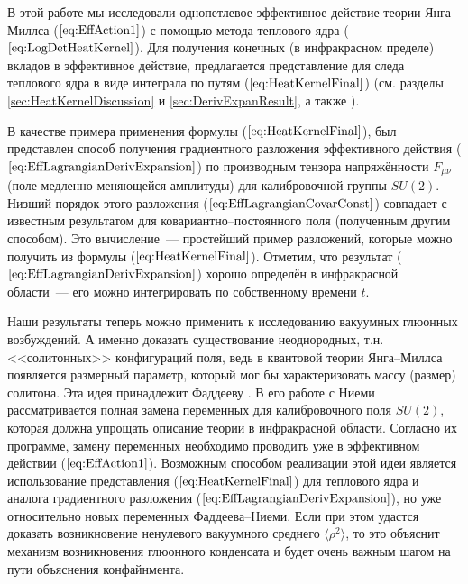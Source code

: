 
В этой работе мы исследовали однопетлевое эффективное действие теории Янга--Миллса ($\ref{eq:EffAction1}$) с помощью метода теплового ядра ($\ref{eq:LogDetHeatKernel}$). Для получения конечных (в инфракрасном пределе) вкладов в эффективное действие, предлагается представление для следа теплового ядра в виде интеграла по путям ($\ref{eq:HeatKernelFinal}$) (см. разделы \ref{sec:HeatKernelDiscussion} и \ref{sec:DerivExpanResult}, а также \cite{Mnev}).

В качестве примера применения формулы ($\ref{eq:HeatKernelFinal}$), был представлен способ получения градиентного разложения эффективного действия ($\ref{eq:EffLagrangianDerivExpansion}$) по производным тензора напряжённости $F_{\mu \nu}$ (поле медленно меняющейся амплитуды) для калибровочной группы $SU(2)$. Низший порядок этого разложения ($\ref{eq:EffLagrangianCovarConst}$) совпадает с известным результатом для ковариантно--постоянного поля \cite{Savvidy1977} (полученным другим способом). Это вычисление~--- простейший пример разложений, которые можно получить из формулы ($\ref{eq:HeatKernelFinal}$). Отметим, что результат ($\ref{eq:EffLagrangianDerivExpansion}$) хорошо определён в инфракрасной области~--- его можно интегрировать по собственному времени $t$.

Наши результаты теперь можно применить к исследованию вакуумных глюонных возбуждений. А именно доказать существование неоднородных, т.н. <<солитонных>> конфигураций поля, ведь  в квантовой теории Янга--Миллса появляется размерный параметр, который мог бы характеризовать массу (размер) солитона. Эта идея принадлежит Фаддееву \cite{Faddeev2008}. В его работе с Ниеми \cite{Faddeev2007} рассматривается полная замена переменных для калибровочного поля $SU(2)$, которая должна упрощать описание теории в инфракрасной области. Согласно их программе, замену переменных необходимо проводить уже в эффективном действии ($\ref{eq:EffAction1}$). Возможным способом реализации этой идеи является использование представления ($\ref{eq:HeatKernelFinal}$) для теплового ядра и аналога градиентного разложения ($\ref{eq:EffLagrangianDerivExpansion}$), но уже относительно новых переменных Фаддеева--Ниеми. Если при этом удастся доказать возникновение ненулевого вакуумного среднего $\langle \rho^2\rangle$, то это объяснит механизм возникновения глюонного конденсата и будет очень важным шагом на пути объяснения конфайнмента.